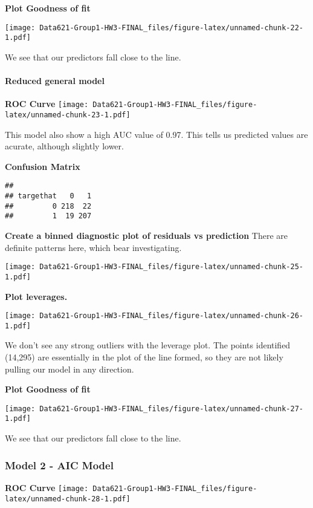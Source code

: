 \documentclass[
]{article}
\begin{document}
\textbf{Plot Goodness of fit}

\texttt{[image: Data621-Group1-HW3-FINAL\_files/figure-latex/unnamed-chunk-22-1.pdf]}

We see that our predictors fall close to the line.

\hypertarget{reduced-general-model}{%
\paragraph{Reduced general model}\label{reduced-general-model}}

\textbf{ROC Curve}
\texttt{[image: Data621-Group1-HW3-FINAL\_files/figure-latex/unnamed-chunk-23-1.pdf]}

This model also show a high AUC value of 0.97. This tells us predicted
values are acurate, although slightly lower.

\textbf{Confusion Matrix}

\begin{verbatim}
##          
## targethat   0   1
##         0 218  22
##         1  19 207
\end{verbatim}

\textbf{Create a binned diagnostic plot of residuals vs prediction}
There are definite patterns here, which bear investigating.

\texttt{[image: Data621-Group1-HW3-FINAL\_files/figure-latex/unnamed-chunk-25-1.pdf]}

\textbf{Plot leverages.}

\texttt{[image: Data621-Group1-HW3-FINAL\_files/figure-latex/unnamed-chunk-26-1.pdf]}

We don't see any strong outliers with the leverage plot. The points
identified (14,295) are essentially in the plot of the line formed, so
they are not likely pulling our model in any direction.

\textbf{Plot Goodness of fit}

\texttt{[image: Data621-Group1-HW3-FINAL\_files/figure-latex/unnamed-chunk-27-1.pdf]}

We see that our predictors fall close to the line.

\hypertarget{model-2---aic-model}{%
\subsubsection{Model 2 - AIC Model}\label{model-2---aic-model}}

\textbf{ROC Curve}
\texttt{[image: Data621-Group1-HW3-FINAL\_files/figure-latex/unnamed-chunk-28-1.pdf]}
\end{document}
